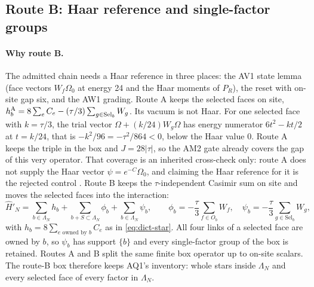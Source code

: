 \subsection{Route B: Haar reference and single-factor groups}
\label{sec:ax1-routeb}
\paragraph{Why route B.}
The admitted chain needs a Haar reference in three places: the AV1 state
lemma (face vectors $W_f\Omega_0$ at energy 24 and the Haar moments of $P_R$),
the reset with on-site gap six, and the AW1 grading. Route A keeps the
selected faces on site,
$h_b^{\rm A}=8\sum_eC_e-(\tau/3)\sum_{g\in\mathrm{Sel}_b}W_g$. Its vacuum is
not Haar. For one selected face with $k=\tau/3$, the trial vector
$\Omega+(k/24)W_g\Omega$ has energy numerator $6t^2-kt/2$ at $t=k/24$, that is
$-k^2/96=-\tau^2/864<0$, below the Haar value $0$. Route A keeps the triple in
the box and $J=28|\tau|$, so the AM2 gate already covers the gap of this very
operator. That coverage is an inherited cross-check only: route A does not
supply the Haar vector $\psi=e^{-C}\Omega_0$, and claiming the Haar reference
for it is the rejected control . Route B
keeps the $\tau$-independent Casimir sum on site and moves the selected faces
into the interaction:
\begin{equation}
 \widehat H'_N=\sum_{b\in\Lambda_N}h_b+\sum_{b+S\subset\Lambda_N}\phi_b
 +\sum_{b\in\Lambda_N}\psi_b,\qquad
 \phi_b=-\frac\tau3\sum_{f\in O_b}W_f,\quad
 \psi_b=-\frac\tau3\sum_{g\in\mathrm{Sel}_b}W_g ,
 \label{eq:ax1-routeb}
\end{equation}
with $h_b=8\sum_{e\text{ owned by }b}C_e$ as in \eqref{eq:dict-star}. All four
links of a selected face are owned by $b$, so $\psi_b$ has support $\{b\}$ and
every single-factor group of the box is retained. Routes A and B split the
same finite box operator up to on-site scalars. The route-B box therefore
keeps AQ1's inventory: whole stars inside $\Lambda_N$ and every selected face
of every factor in $\Lambda_N$.


